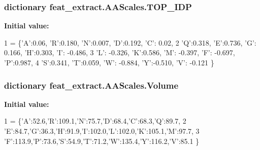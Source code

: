 \subsubsection[{T\+O\+P\+\_\+\+I\+D\+P}]{\setlength{\rightskip}{0pt plus 5cm}dictionary feat\+\_\+extract.\+A\+A\+Scales.\+T\+O\+P\+\_\+\+I\+D\+P}\label{namespacefeat__extract_1_1_a_a_scales_a10480e9775cdaee458b50fa51a5bd829}
{\bfseries Initial value\+:}
\begin{DoxyCode}
1 = \{\textcolor{stringliteral}{'A'}:0.06, \textcolor{stringliteral}{'}\textcolor{stringliteral}{R':0.180, '}N':0.007, 'D':0.192, 'C': 0.02,
2       \textcolor{stringliteral}{'Q'}:0.318, \textcolor{stringliteral}{'E'}:0.736, \textcolor{stringliteral}{'G'}: 0.166, \textcolor{stringliteral}{'H'}:0.303, \textcolor{stringliteral}{'I'}: -0.486,
3       \textcolor{stringliteral}{'L'}: -0.326, \textcolor{stringliteral}{'K'}:0.586, \textcolor{stringliteral}{'M'}: -0.397, \textcolor{stringliteral}{'F'}: -0.697, \textcolor{stringliteral}{'P'}:0.987,
4       \textcolor{stringliteral}{'S'}:0.341, \textcolor{stringliteral}{'T'}:0.059, \textcolor{stringliteral}{'W'}: -0.884, \textcolor{stringliteral}{'Y'}:-0.510, \textcolor{stringliteral}{'V'}: -0.121 \}
\end{DoxyCode}
\hypertarget{namespacefeat__extract_1_1_a_a_scales_a4346924997e780ce5139157f8f0d61b7}{}
\subsubsection[{Volume}]{\setlength{\rightskip}{0pt plus 5cm}dictionary feat\+\_\+extract.\+A\+A\+Scales.\+Volume}\label{namespacefeat__extract_1_1_a_a_scales_a4346924997e780ce5139157f8f0d61b7}
{\bfseries Initial value\+:}
\begin{DoxyCode}
1 = \{\textcolor{stringliteral}{'A'}:52.6,\textcolor{stringliteral}{'}\textcolor{stringliteral}{R':109.1,'}N':75.7,'D':68.4,'C':68.3,'Q':89.7,
2                                          \textcolor{stringliteral}{'E'}:84.7,\textcolor{stringliteral}{'G'}:36.3,\textcolor{stringliteral}{'H'}:91.9,\textcolor{stringliteral}{'I'}:102.0,\textcolor{stringliteral}{'L'}:102.0,\textcolor{stringliteral}{'K'}:105.1,\textcolor{stringliteral}{'M'}:97.7,
3                                           \textcolor{stringliteral}{'F'}:113.9,\textcolor{stringliteral}{'P'}:73.6,\textcolor{stringliteral}{'S'}:54.9,\textcolor{stringliteral}{'T'}:71.2,\textcolor{stringliteral}{'W'}:135.4,\textcolor{stringliteral}{'Y'}:116.2,\textcolor{stringliteral}{'V'}:85.1
      \}
\end{DoxyCode}
